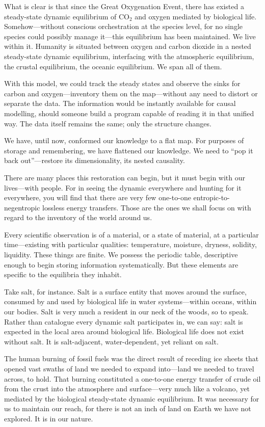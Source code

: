 What is clear is that since the Great Oxygenation Event, there has existed a steady-state dynamic equilibrium of CO$_2$ and oxygen mediated by biological life. Somehow—without conscious orchestration at the species level, for no single species could possibly manage it—this equilibrium has been maintained. We live within it. Humanity is situated between oxygen and carbon dioxide in a nested steady-state dynamic equilibrium, interfacing with the atmospheric equilibrium, the crustal equilibrium, the oceanic equilibrium. We span all of them.

With this model, we could track the steady states and observe the sinks for carbon and oxygen—inventory them on the map—without any need to distort or separate the data. The information would be instantly available for causal modelling, should someone build a program capable of reading it in that unified way. The data itself remains the same; only the structure changes.

We have, until now, conformed our knowledge to a flat map. For purposes of storage and remembering, we have flattened our knowledge. We need to “pop it back out”—restore its dimensionality, its nested causality.

There are many places this restoration can begin, but it must begin with our lives—with people. For in seeing the dynamic everywhere and hunting for it everywhere, you will find that there are very few one-to-one entropic-to-negentropic lossless energy transfers. Those are the ones we shall focus on with regard to the inventory of the world around us.

Every scientific observation is of a material, or a state of material, at a particular time—existing with particular qualities: temperature, moisture, dryness, solidity, liquidity. These things are finite. We possess the periodic table, descriptive enough to begin storing information systematically. But these elements are specific to the equilibria they inhabit.

Take salt, for instance. Salt is a surface entity that moves around the surface, consumed by and used by biological life in water systems—within oceans, within our bodies. Salt is very much a resident in our neck of the woods, so to speak. Rather than catalogue every dynamic salt participates in, we can say: salt is expected in the local area around biological life. Biological life does not exist without salt. It is salt-adjacent, water-dependent, yet reliant on salt.

The human burning of fossil fuels was the direct result of receding ice sheets that opened vast swaths of land we needed to expand into—land we needed to travel across, to hold. That burning constituted a one-to-one energy transfer of crude oil from the crust into the atmosphere and surface—very much like a volcano, yet mediated by the biological steady-state dynamic equilibrium. It was necessary for us to maintain our reach, for there is not an inch of land on Earth we have not explored. It is in our nature.

